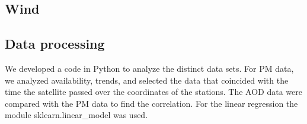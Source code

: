 \subsection{Wind}
\subsection{Data processing}
We developed a code in Python to analyze the distinct data sets. For PM data, we analyzed availability,
trends, and selected the data that coincided with the time the satellite passed over the coordinates of
the stations. The AOD data were compared with the PM data to find the correlation. For the linear regression
the module sklearn.linear\_model was used.